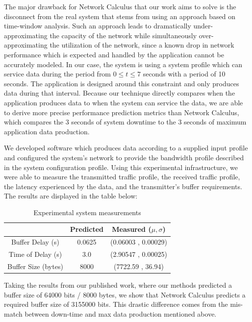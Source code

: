 The major drawback for Network Calculus that our work aims to solve is
the disconnect from the real system that stems from using an approach
based on time-window analysis.  Such an approach leads to dramatically
under-approximating the capacity of the network while simultaneously
over-approximating the utilization of the network, since a known drop
in network performance which is expected and handled by the
application cannot be accurately modeled.  In our case, the system is
using a system profile which can service data during the period from
$0\le t\le 7$ seconds with a period of 10 seconds.  The
application is designed around this constraint and only produces data
during that interval.  Because our technique directly compares when
the application produces data to when the system can service the data,
we are able to derive more precise performance prediction metrics than
Network Calculus, which compares the 3 seconds of system downtime to
the 3 seconds of maximum application data production.

We developed software which produces data according to a supplied
input profile and configured the system's network to provide the
bandwidth profile described in the system configuration profile.
Using this experimental infrastructure, we were able to measure the
transmitted traffic profile, the received traffic profile, the latency
experienced by the data, and the transmitter's buffer requirements.
The results are displayed in the table below:

\begin{table}[htbp]
\caption{Experimental system measurements}
\begin{tabular}{| c | c | c |}
\hline
 & Predicted & Measured ($\mu,\sigma$) \\\hline
Buffer Delay (s) & 0.0625 & (0.06003 , 0.00029) \\\hline
Time of Delay (s) & 3.0 & (2.90547 , 0.00025) \\\hline
Buffer Size (bytes) & 8000 & (7722.59 , 36.94) \\\hline
\end{tabular}
\label{table:results}
\end{table}

Taking the results from our published work, where our methods
predicted a buffer size of 64000 bits / 8000 bytes, we show that
Network Calculus predicts a required buffer size of 3155000 bits. This
drastic difference comes from the mis-match between down-time and max
data production mentioned above.

